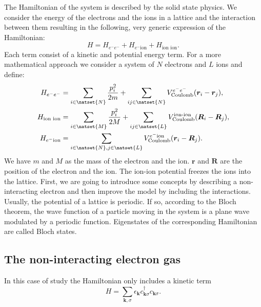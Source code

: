 \documentclass[../main.tex]{subfile}
\begin{document}
The Hamiltonian of the system is described by the solid state physics. We consider the energy of the electrons and the ions in a lattice and the interaction between them resulting in 
the following, very generic expression of the Hamiltonian:
\[
    H = H_{e^-e^-} + H_{e^-\text{ion}} + H_{\text{ion ion}}.
\]
Each term consist of a kinetic and potential energy term. For a more mathematical approach we consider a system of $N$ electrons and $L$ ions and define:
\begin{align*}
    H_{e^-e^-} &= \sum_{i \in \natset{N}} \frac{p_i^2}{2m} + \sum_{ij\in\natset{N}} V_{\text{Coulomb}}^{e^-e^-}(\bm{r}_i-\bm{r}_j), \\
    H_{\text{ion ion}} &=  \sum_{i \in \natset{M}} \frac{p_i^2}{2M} + \sum_{ij\in\natset{L}} V_{\text{Coulomb}}^{\text{ion-ion}}(\bm{R}_i-\bm{R}_j), \\
    H_{e^-\text{ion}} &= \sum_{i\in \natset{N},j\in \natset{L}} V_{\text{Coulomb}}^{e^-\text{ion}}(\bm{r}_i-\bm{R}_j).
\end{align*}
We have $m$ and $M$ as the mass of the electron and the ion. $\bm{r}$ and $\bm{R}$ are the position of the electron and the ion. The ion-ion potential
freezes the ions into the lattice. 
First, we are going to introduce some concepts by describing a non-interacting electron and then improve the model by including the interactions.
Usually, the potential of a lattice is periodic. If so, according to the Bloch theorem, the wave function of a particle moving in the system is a plane wave modulated
by a periodic function. Eigenstates of the corresponding Hamiltonian are called Bloch states.

\subsection{The non-interacting electron gas}
In this case of study the Hamiltonian only includes a kinetic term
\begin{equation}\label{eq:NonInteractingHamiltonian}
    H=\sum_{\bm{k},\sigma} \epsilon_{\bm{k}} c_{\bm{k}\sigma}^{\dagger}c_{\bm{k}\sigma}.
\end{equation}
\end{document}
